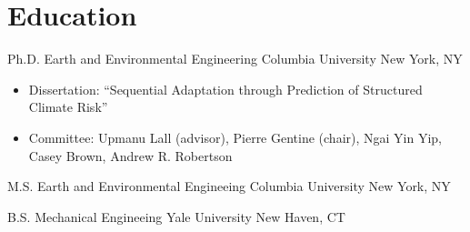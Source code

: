 \section{Education}

{Ph.D.}
{Earth and Environmental Engineering}
{Columbia University}
{New York, NY}
{
	\begin{itemize}
		\item Dissertation: ``Sequential Adaptation through Prediction of Structured Climate Risk''
		\item Committee: Upmanu Lall (advisor), Pierre Gentine (chair), Ngai Yin Yip, Casey Brown, Andrew R. Robertson
	\end{itemize}
}

{M.S.}
{Earth and Environmental Engineeing}
{Columbia University}
{New York, NY}
{}

{B.S.}
{Mechanical Engineeing}
{Yale University}
{New Haven, CT}
{}
